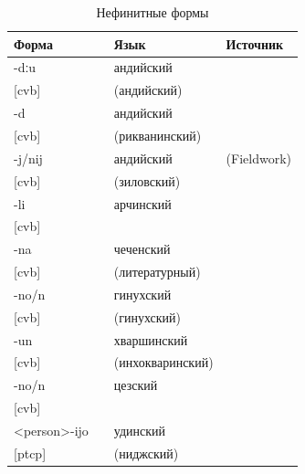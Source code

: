 \begin{table}[ht]
\caption{Нефинитные формы}
\label{tab:nonfin}
\vspace{0.2cm}
\begin{center}
\begin{tabular}{ll|ll}
\multicolumn{2}{l|}{Форма} & Язык      & Источник   \\ \hline
-dːu	&		&	андийский	&	\citep{kibrik1985}	\\
{[}cvb{]}	&		&	(андийский)	&		\\
-d	&		&	андийский	&	\citep{verhees2018}	\\
{[}cvb{]}	&		&	(рикванинский)	&		\\
-j/nij	&		&	андийский	&	(Fieldwork)	\\
{[}cvb{]}	&		&	(зиловский)	&		\\
-li	&		&	арчинский	&	\citep{tatevosov2001}	\\
{[}cvb{]}	&		&		&		\\
-na	&		&	чеченский	&	\citep{molochieva2010}	\\
{[}cvb{]}	&		&	(литературный)	&		\\
-no/n	&		&	гинухский	&	\citep{forker2013}	\\
{[}cvb{]}	&		&	(гинухский)	&		\\
-un	&		&	хваршинский	&	\citep{khalilova2011}	\\
{[}cvb{]}	&		&	(инхокваринский)	&		\\
-no/n	&		&	цезский	&	\citep{khalilova2011}	\\
{[}cvb{]}	&		&		&		\\
<person>-ijo	&		&	удинский	&	\citep{maisak2016}	\\
{[}ptcp{]}	&		&	(ниджский)	&		\\
\end{tabular}
\end{center}
\end{table}

